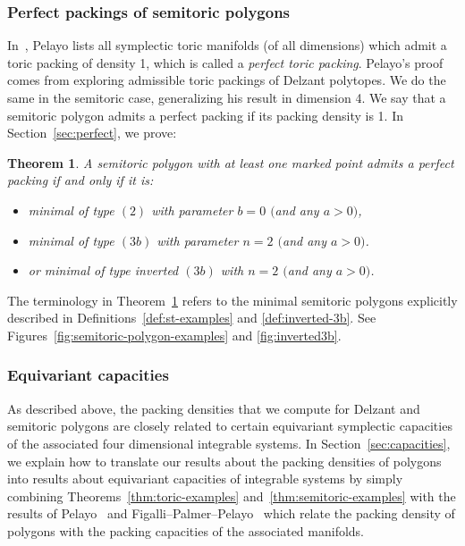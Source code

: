 \documentclass[pdftex]{sigma}
\numberwithin{equation}{section}
\newtheorem{Theorem}{Theorem}[section]
\begin{document}
\subsubsection{Perfect packings of semitoric polygons}

In~\cite{Pe2006}, Pelayo lists all symplectic toric manifolds (of all dimensions) which admit a toric packing of density 1, which is called a \emph{perfect toric packing}.
Pelayo's proof comes from exploring admissible toric packings of Delzant polytopes. We do the same in the semitoric case, generalizing his result in dimension 4. We say that a semitoric polygon admits a perfect packing if its packing density is 1. In Section~\ref{sec:perfect}, we prove:

\begin{Theorem}\label{thm:perfect}
A semitoric polygon with at least one marked point admits a perfect packing if and only if it is:
\begin{itemize}\itemsep=0pt
 \item minimal of type $(2)$ with parameter $b=0$ $($and any $a>0)$,
 \item minimal of type $(3b)$ with parameter $n=2$ $($and any $a>0)$.
 \item or minimal of type inverted $(3b)$ with $n=2$ $($and any $a>0)$.
\end{itemize}
\end{Theorem}

The terminology in Theorem~\ref{thm:perfect} refers to the minimal semitoric polygons explicitly described in Definitions~\ref{def:st-examples} and \ref{def:inverted-3b}. See Figures~\ref{fig:semitoric-polygon-examples} and \ref{fig:inverted3b}.

\subsubsection{Equivariant capacities}
As described above, the packing densities that we compute for Delzant and semitoric polygons are closely related to certain equivariant symplectic capacities of the associated four dimensional integrable systems.
In Section~\ref{sec:capacities}, we explain how to translate our results about the packing densities of polygons into results about equivariant capacities of integrable systems
 by simply combining Theorems~\ref{thm:toric-examples} and~\ref{thm:semitoric-examples} with the results of Pelayo~\cite{Pe2006, Pe2007} and Figalli--Palmer--Pelayo~\cite{FiPaPe2016} which relate the packing density of polygons with the packing capacities of the associated manifolds.
\end{document}
